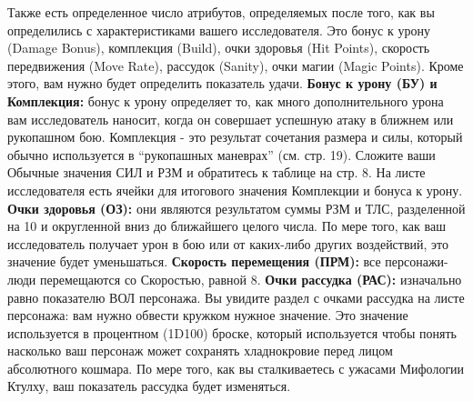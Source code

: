 \documentclass[letterpaper,twocolumn,openany, twoside, 11pt, usenames]{cocbook}
\begin{document}
Также есть определенное число атрибутов, определяемых после того, как вы определились с характеристиками вашего исследователя. Это бонус к урону (Damage Bonus), комплекция (Build), очки здоровья (Hit Points), скорость передвижения (Move Rate), рассудок (Sanity), очки магии (Magic Points). Кроме этого, вам нужно будет определить показатель удачи.
\smallbreak
\noindent \textbf{Бонус к урону (БУ) и Комплекция:} бонус к урону определяет то, как много дополнительного урона вам исследователь наносит, когда он совершает успешную атаку в ближнем или рукопашном бою. Комплекция - это результат сочетания размера и силы, который обычно используется в ``рукопашных маневрах'' (см. стр. 19). Сложите ваши Обычные значения СИЛ и РЗМ и обратитесь к таблице на стр. 8. На листе исследователя есть ячейки для итогового значения Комплекции и бонуса к урону.
\smallbreak
\noindent \textbf{Очки здоровья (ОЗ):} они являются результатом суммы РЗМ и ТЛС, разделенной на 10 и округленной вниз до ближайшего целого числа. По мере того, как ваш исследователь получает урон в бою или от каких-либо других воздействий, это значение будет уменьшаться.
\smallbreak
\noindent {}
\smallbreak
\noindent \textbf{Скорость перемещения (ПРМ):} все персонажи-люди перемещаются со Скоростью, равной 8.
\smallbreak
\noindent \textbf{Очки рассудка (РАС):} изначально равно показателю ВОЛ персонажа. Вы увидите раздел с очками рассудка на листе персонажа: вам нужно обвести кружком нужное значение. Это значение используется в процентном (1D100) броске, который используется чтобы понять насколько ваш персонаж может сохранять хладнокровие перед лицом абсолютного кошмара. По мере того, как вы сталкиваетесь с ужасами Мифологии Ктулху, ваш показатель рассудка будет изменяться.
\smallbreak
\noindent {}
\smallbreak
\end{document}
